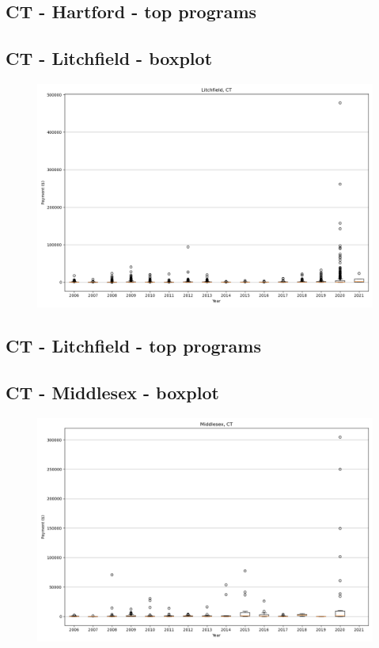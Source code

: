 \subsection*{CT - Hartford - top programs}

\newpage
\subsection*{CT - Litchfield - boxplot}
\begin{figure}[h]
\centering
\includegraphics[width=7in]{../output/boxplots/counties/Litchfield-CT_boxplot.png}
\end{figure}


\subsection*{CT - Litchfield - top programs}

\newpage
\subsection*{CT - Middlesex - boxplot}
\begin{figure}[h]
\centering
\includegraphics[width=7in]{../output/boxplots/counties/Middlesex-CT_boxplot.png}
\end{figure}


